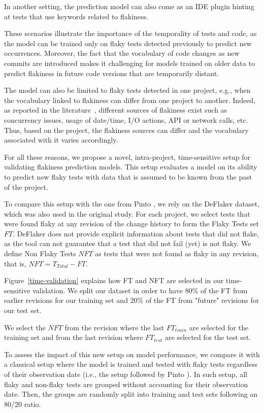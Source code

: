 In another setting, the prediction model can also come as an IDE plugin hinting at tests that use keywords related to flakiness.

These scenarios illustrate the importance of the temporality of tests and code, as the model can be trained only on flaky tests detected previously to predict new occurrences.
Moreover, the fact that the vocabulary of code changes as new commits are introduced makes it challenging for models trained on older data to predict flakiness in future code versions that are temporarily distant.

The model can also be limited to flaky tests detected in one project, e.g., when the vocabulary linked to flakiness can differ from one project to another. 
Indeed, as reported in the literature~\cite{Luo2014,Lam2019RootCausing}, different sources of flakiness exist such as concurrency issues, usage of date/time, I/O actions, API or network calls, etc. 
Thus, based on the project, the flakiness sources can differ and the vocabulary associated with it varies accordingly.

For all these reasons, we propose a novel, intra-project, time-sensitive setup for validating flakiness prediction models.
This setup evaluates a model on its ability to predict new flaky tests with data that is assumed to be known from the past of the project.

To compare this setup with the one from Pinto \etal, we rely on the DeFlaker dataset, which was also used in the original study.
For each project, we select tests that were found flaky at any revision of the change history to form the Flaky Tests set $FT$. 
DeFlaker does not provide explicit information about tests that did not flake, as the tool can not guarantee that a test that did not fail (yet) is not flaky. 
We define Non Flaky Tests $NFT$ as tests that were not found as flaky in any revision, that is, $NFT = T_{Total} - FT$.

Figure~\ref{time-validation} explains how FT and NFT are selected in our time-sensitive validation. We split our dataset in order to have 80\% of the FT from earlier revisions for our training set and 20\% of the FT from "future" revisions for our test set. 

We select the $NFT$ from the revision where the last $FT_{train}$ are selected for the training set and from the last revision where $FT_{test}$ are selected for the test set.

To assess the impact of this new setup on model performance, we compare it with a classical setup where the model is trained and tested with flaky tests regardless of their observation date (i.e., the setup followed by Pinto \etal).
In such setup, all flaky and non-flaky tests are grouped without accounting for their observation date. 
Then, the groups are randomly split into training and test sets following an 80/20 ratio. 

